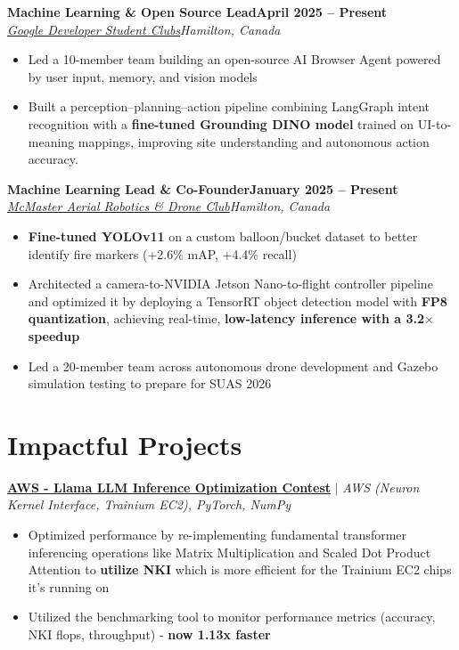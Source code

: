 \documentclass[letterpaper,10pt]{article}
\newcommand{\entry}[4]{\textbf{#1}\hfill\textbf{\small #2}\\\textit{\small #3}\hfill\textit{\small #4}\par}
\begin{document}
\entry{Machine Learning \& Open Source Lead}{April 2025 -- Present}{\href{https://github.com/DSC-McMaster-U/interface-ai}{Google Developer Student Clubs}}{Hamilton, Canada}
\begin{itemize}\small
\item Led a 10-member team building an open-source AI Browser Agent powered by user input, memory, and vision models
\item Built a perception--planning--action pipeline combining LangGraph intent recognition with a \textbf{fine-tuned Grounding DINO model} trained on UI-to-meaning mappings, improving site understanding and autonomous action accuracy.
\end{itemize}\vspace{2pt}
\entry{Machine Learning Lead \& Co-Founder}{January 2025 -- Present}{\href{https://www.macdrones.ca/}{McMaster Aerial Robotics \& Drone Club}}{Hamilton, Canada}
\begin{itemize}\small
\item \textbf{Fine-tuned YOLOv11} on a custom balloon/bucket dataset to better identify fire markers (+2.6\% mAP, +4.4\% recall)
\item Architected a camera-to-NVIDIA Jetson Nano-to-flight controller pipeline and optimized it by deploying a TensorRT object detection model with \textbf{FP8 quantization}, achieving real-time, \textbf{low-latency inference with a 3.2\ensuremath{\times} speedup}
\item Led a 20-member team across autonomous drone development and Gazebo simulation testing to prepare for SUAS 2026
\end{itemize}\vspace{2pt}
\section{Impactful Projects}
{\small\textbf{\href{https://github.com/SachinVedGupta/nki-llama}{AWS - Llama LLM Inference Optimization Contest}} $|$ \emph{AWS (Neuron Kernel Interface, Trainium EC2), PyTorch, NumPy}}\par
\begin{itemize}\small
\item Optimized performance by re-implementing fundamental transformer inferencing operations like Matrix Multiplication and Scaled Dot Product Attention to \textbf{utilize NKI} which is more efficient for the Trainium EC2 chips it's running on
\item Utilized the benchmarking tool to monitor performance metrics (accuracy, NKI flops, throughput) - \textbf{now 1.13x faster}
\end{itemize}
\end{document}
